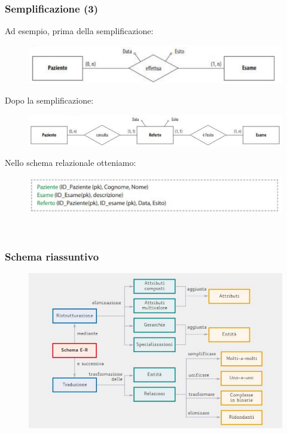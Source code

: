 \documentclass[]{beamer}
\begin{document}
\begin{frame}
\frametitle{Semplificazione (3)}
Ad esempio, prima della semplificazione:
\begin{figure}
  \includegraphics[width=.7\columnwidth]{img/ristrutturazione5.png}
\end{figure}
Dopo la semplificazione:
\begin{figure}
  \includegraphics[width=\columnwidth]{img/ristrutturazione6.png}
\end{figure}
Nello schema relazionale otteniamo:
\begin{figure}
  \includegraphics[width=.9\columnwidth]{img/ristrutturazione7.png}

  ~

  \href{https://drive.google.com/file/d/1JC_u1LHESKUEAs66X9ybOHXqbAzYluJ5/view?usp=share_link}{}
\end{figure}
\end{frame}


\begin{frame}
\frametitle{Schema riassuntivo}
\begin{figure}
  \includegraphics[width=\columnwidth]{img/schemaprogettazionedb.png}
\end{figure}
\end{frame}
\end{document}
